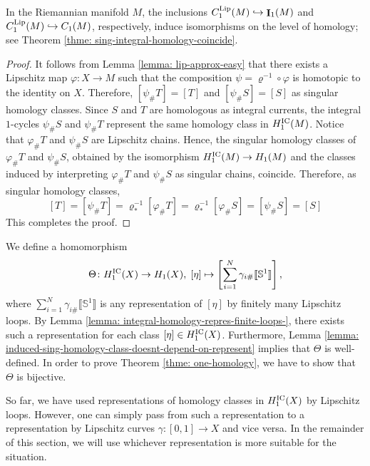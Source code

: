 \documentclass{amsart}
\numberwithin{equation}{section}
\DeclareMathOperator{\bI}{\mathbf{I}}
\newcommand{\bb}[1]{\llbracket #1\rrbracket}
\begin{document}
        In the Riemannian manifold $M$, the inclusions $C_1^\textup{Lip}(M)\hookrightarrow \bI_1(M)$ and $C_1^\textup{Lip}(M)\hookrightarrow C_1(M)$, respectively, induce isomorphisms on the level of homology; see Theorem \ref{thme: sing-integral-homology-coincide}.
        

        \begin{proof}
            It follows from Lemma \ref{lemma: lip-approx-easy} that there exists a Lipschitz map $\varphi\colon X \to M$ such that the composition $\psi = \varrho^{-1}\circ \varphi$ is homotopic to the identity on $X$. Therefore, $[\psi_\#T] = [T]$ and $[\psi_\#S]=[S]$ as singular homology classes. Since $S$ and $T$ are homologous as integral currents, the integral $1$-cycles $\psi_\# S$ and $\psi_\# T $ represent the same homology class in $H_1^\textup{IC}(M)$. Notice that $\varphi_\# T$ and $\psi_\#S$ are Lipschitz chains. Hence, the singular homology classes of $\varphi_\# T$ and $\psi_\#S$, obtained by the isomorphism $H_1^\textup{IC}(M) \to H_1(M)$ and the classes induced by interpreting $\varphi_\# T$ and $\psi_\#S$ as singular chains, coincide. Therefore, as singular homology classes, 
            $$[T] = [\psi_\#T] = \varrho^{-1}_*[\varphi_\#T] =  \varrho^{-1}_*[\varphi_\#S]= [\psi_\#S]= [S]$$
            This completes the proof.
        \end{proof}

        We define a homomorphism 
        \begin{equation}\label{eq: definition-homomorph-1-dim-homology}
            \Theta\colon H_1^\textup{IC}(X) \to H_1(X), \; [\eta] \mapsto \left[\sum_{i=1}^N \gamma_{i\#}\bb{\mathbb{S}^1} \right],
        \end{equation}
        where $\sum_{i=1}^N \gamma_{i\#}\bb{\mathbb{S}^1}$ is any representation of $[\eta]$ by finitely many Lipschitz loops. By Lemma \ref{lemma: integral-homology-repres-finite-loops-}, there exists such a representation for each class $[\eta] \in H_1^\textup{IC}(X)$. Furthermore, Lemma \ref{lemma: induced-sing-homology-class-doesnt-depend-on-represent} implies that $\Theta$ is well-defined. In order to prove Theorem \ref{thme: one-homology}, we have to show that $\Theta$ is bijective.

        \medskip

        So far, we have used representations of homology classes in $H_1^\textup{IC}(X)$ by Lipschitz loops. However, one can simply pass from such a representation to a representation by Lipschitz curves $\gamma\colon [0,1]\to X$ and vice versa.  In the remainder of this section, we will use whichever representation is more suitable for the situation. 
\end{document}
